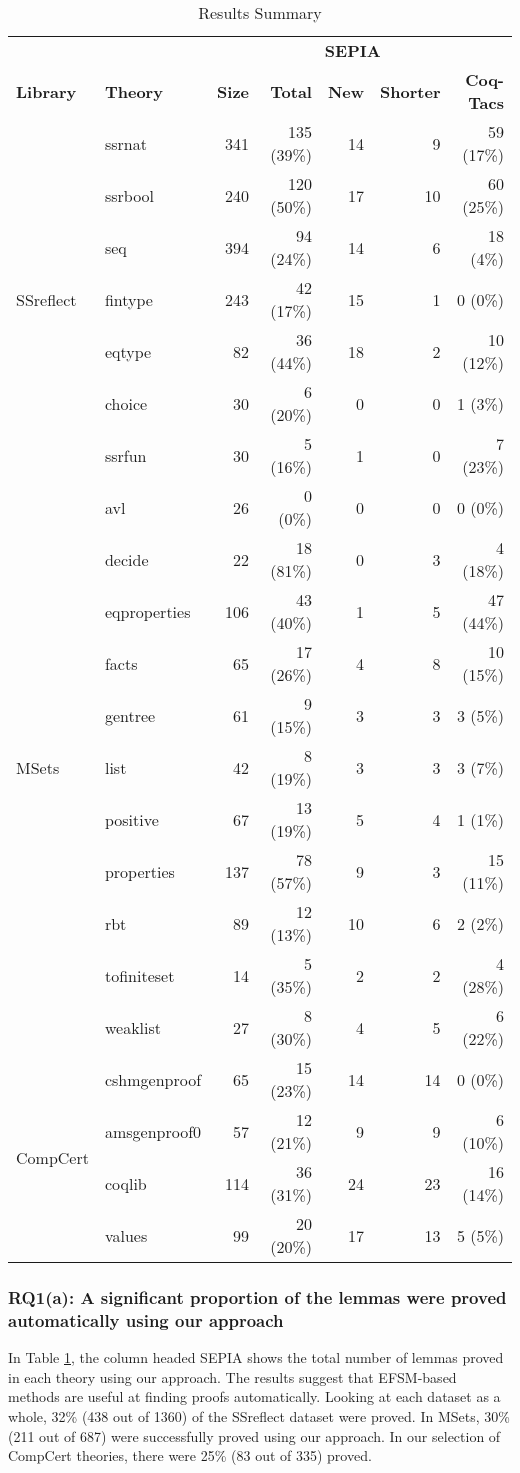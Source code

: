 \documentclass{llncs}
\begin{document}
\begin{table}[t]
\centering
\caption{Results Summary}
\label{tab:res}
\def\arraystretch{1.2}
\setlength\tabcolsep{1.5mm}
\begin{tabular}{llrrrrr} 
&&&\multicolumn{3}{c}{\textbf{SEPIA}}&\\
\cmidrule(r){4-6}
\textbf{Library}&\textbf{Theory}&\textbf{Size}&\textbf{Total}&\textbf{New}&\textbf{Shorter}&\textbf{Coq-Tacs}\\ 
\midrule 
\multirow{7}{*}{SSreflect}&ssrnat&341&135 (39\%)&14&9&59 (17\%)\\
&ssrbool&240&120 (50\%)&17&10&60 (25\%)\\
&seq&394&94 (24\%)&14&6&18 (4\%)\\
&fintype&243&42 (17\%)&15&1&0 (0\%)\\
&eqtype&82&36 (44\%)&18&2&10 (12\%)\\
&choice&30&6 (20\%)&0&0&1 (3\%)\\
&ssrfun&30&5 (16\%)&1&0&7 (23\%)\\
\midrule
\multirow{11}{*}{MSets}&avl&26&0 (0\%)&0&0&0 (0\%)\\
&decide&22&18 (81\%)&0&3&4 (18\%)\\
&eqproperties&106&43 (40\%)&1&5&47 (44\%)\\
&facts&65&17 (26\%)&4&8&10 (15\%)\\
&gentree&61&9 (15\%)&3&3&3 (5\%)\\
&list&42&8 (19\%)&3&3&3 (7\%)\\
&positive&67&13 (19\%)&5&4&1 (1\%)\\
&properties&137&78 (57\%)&9&3&15 (11\%)\\
&rbt&89&12 (13\%)&10&6&2 (2\%)\\
&tofiniteset&14&5 (35\%)&2&2&4 (28\%)\\
&weaklist&27&8 (30\%)&4&5&6 (22\%)\\
\midrule
\multirow{4}{*}{CompCert}&cshmgenproof&65&15 (23\%)&14&14&0 (0\%)\\
&amsgenproof0&57&12 (21\%)&9&9&6 (10\%)\\
&coqlib&114&36 (31\%)&24&23&16 (14\%)\\
&values&99&20 (20\%)&17&13&5 (5\%)\\
\bottomrule 
\end{tabular}
\end{table}

\vspace{-3mm}

\subsubsection{RQ1(a): A significant proportion of the lemmas were proved automatically using our approach}
In Table \ref{tab:res}, the column headed SEPIA shows the total number of lemmas proved in each theory using our approach. The results suggest that EFSM-based methods are useful at finding proofs automatically. Looking at each dataset as a whole, 32\% (438 out of 1360) of the SSreflect dataset were proved. In MSets, 30\% (211 out of 687) were successfully proved using our approach. In our selection of CompCert theories, there were 25\% (83 out of 335) proved. 
\end{document}

